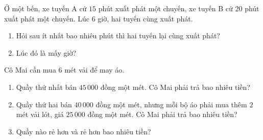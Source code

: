 \begin{bt} Ở một bến, xe tuyến A cứ $15$ phút xuất phát một chuyến, xe tuyến B cứ $20$ phút xuất phát một chuyến. Lúc $6$ giờ, hai tuyến cùng xuất phát.
	\begin{enumerate}
		\item Hỏi sau ít nhất bao nhiêu phút thì hai tuyến lại cùng xuất phát?
		\item Lúc đó là mấy giờ?
	\end{enumerate}
\end{bt}

\begin{bt} Cô Mai cần mua $6$ mét vải để may áo.
	\begin{enumerate}
		\item Quầy thứ nhất bán $45\,000$ đồng một mét. Cô Mai phải trả bao nhiêu tiền?
		\item Quầy thứ hai bán $40\,000$ đồng một mét, nhưng mỗi bộ áo phải mua thêm $2$ mét vải lót, giá $25\,000$ đồng một mét. Cô Mai phải trả bao nhiêu tiền?
		\item Quầy nào rẻ hơn và rẻ hơn bao nhiêu tiền?
	\end{enumerate}
\end{bt}


